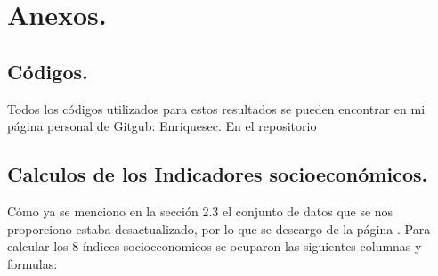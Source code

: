\documentclass[paper=letter, fontsize=11pt]{scrartcl}
\numberwithin{equation}{section} %
\numberwithin{figure}{section} %
\numberwithin{table}{section} %
\begin{document}
\section{Anexos.}
\subsection{Códigos.}
Todos los códigos utilizados para estos resultados se pueden encontrar en mi página personal de Gitgub: Enriquesec. En el repositorio 

\subsection{Calculos de los Indicadores socioeconómicos.}
Cómo ya se menciono en la sección 2.3 el conjunto de datos que se nos proporciono estaba desactualizado, por lo que se descargo de la página . Para calcular los 8 índices socioeconomicos se ocuparon las siguientes columnas y formulas:\\
\end{document}
